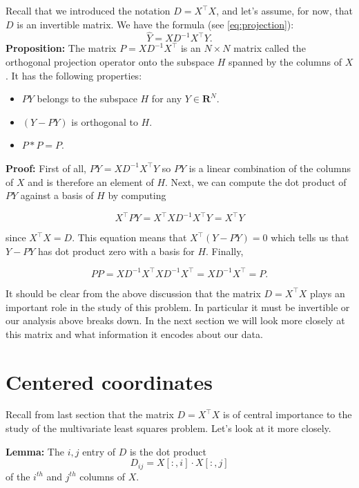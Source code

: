\documentclass[
  oneside]{scrbook}
\providecommand{\tightlist}{%
  \setlength{\itemsep}{0pt}\setlength{\parskip}{0pt}}
\begin{document}
Recall that we introduced the notation \(D=X^{\intercal}X\), and let's
assume, for now, that \(D\) is an invertible matrix. We have the formula
(see \cref{eq:projection}): \[ \hat{Y} = XD^{-1}X^{\intercal}Y.  \]
\textbf{Proposition:} The matrix \(P=XD^{-1}X^{\intercal}\) is an
\(N\times N\) matrix called the orthogonal projection operator onto the
subspace \(H\) spanned by the columns of \(X\). It has the following
properties:

\begin{itemize}
\tightlist
\item
  \(PY\) belongs to the subspace \(H\) for any \(Y\in\mathbf{R}^{N}\).
\item
  \((Y-PY)\) is orthogonal to \(H\).
\item
  \(P*P = P\).
\end{itemize}

\textbf{Proof:} First of all, \(PY=XD^{-1}X^{\intercal}Y\) so \(PY\) is
a linear combination of the columns of \(X\) and is therefore an element
of \(H\). Next, we can compute the dot product of \(PY\) against a basis
of \(H\) by computing

\[ X^{\intercal}PY = X^{\intercal}XD^{-1}X^{\intercal}Y =
X^{\intercal}Y \]

since \(X^{\intercal}X=D\). This equation means that
\(X^{\intercal}(Y-PY)=0\) which tells us that \(Y-PY\) has dot product
zero with a basis for \(H\). Finally,

\[ PP = XD^{-1}X^{\intercal}XD^{-1}X^{\intercal} =
XD^{-1}X^{\intercal}=P.  \]

It should be clear from the above discussion that the matrix
\(D=X^{\intercal}X\) plays an important role in the study of this
problem. In particular it must be invertible or our analysis above
breaks down. In the next section we will look more closely at this
matrix and what information it encodes about our data.

\hypertarget{sec:centered}{%
\section{Centered coordinates}\label{sec:centered}}

Recall from last section that the matrix \(D=X^{\intercal}X\) is of
central importance to the study of the multivariate least squares
problem. Let's look at it more closely.

\textbf{Lemma:} The \(i,j\) entry of \(D\) is the dot product \[
D_{ij}=X[:,i]\cdot X[:,j] \] of the \(i^{th}\) and \(j^{th}\) columns of
\(X\).
\end{document}
